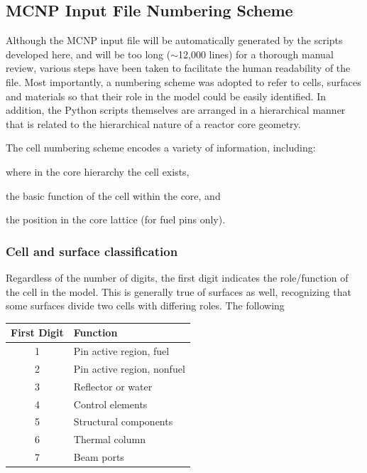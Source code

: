 \documentclass{UWNR_modeling}
\begin{document}
\subsection{MCNP Input File Numbering Scheme}

Although the MCNP input file will be automatically generated by the scripts developed here, and will be too long ($\sim$12,000 lines) for a thorough manual review, various steps have been taken to facilitate the human readability of the file.   Most importantly, a numbering scheme was adopted to refer to cells, surfaces and materials so that their role in the model could be easily identified.  In addition, the Python scripts themselves are arranged in a hierarchical manner that is related to the hierarchical nature of a reactor core geometry.

The cell numbering scheme encodes a variety of information, including:\vspace{-0.9\parsep}
\begin{myitemize}
\item where in the core hierarchy the cell exists,
\item the basic function of the cell within the core, and
\item the position in the core lattice (for fuel pins only).
\end{myitemize}

\subsubsection{Cell and surface classification}

Regardless of the number of digits, the first digit indicates the role/function of the cell in the model.  This is generally true of surfaces as well, recognizing that some surfaces divide two cells with differing roles.  The following

\begin{tabular}{|c|l|}
\hline First Digit & Function\\\hline
1 & Pin active region, fuel\\
2 & Pin active region, nonfuel\\
3 & Reflector or water\\
4 & Control elements\\
5 & Structural components\\
6 & Thermal column\\
7 & Beam ports\\\hline
\end{tabular}
\end{document}
